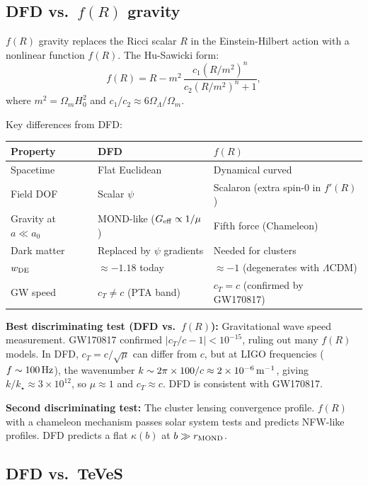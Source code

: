 \documentclass[11pt]{article}
\newcommand{\ee}[1]{\times 10^{#1}}
\newcommand{\mufd}{\mu}
\begin{document}
\subsection{DFD vs.\ $f(R)$ gravity}

$f(R)$ gravity replaces the Ricci scalar $R$ in the Einstein-Hilbert
action with a nonlinear function $f(R)$.  The Hu-Sawicki form:
\begin{equation}
  f(R) = R - m^2\,\frac{c_1(R/m^2)^n}{c_2(R/m^2)^n + 1},
\end{equation}
where $m^2 = \Omega_m H_0^2$ and $c_1/c_2 \approx 6\Omega_\Lambda/\Omega_m$.

Key differences from DFD:
\begin{center}
\begin{tabular}{lll}
\toprule
Property & DFD & $f(R)$ \\
\midrule
Spacetime & Flat Euclidean & Dynamical curved \\
Field DOF & Scalar $\psi$ & Scalaron (extra spin-0 in $f'(R)$) \\
Gravity at $a \ll a_0$ & MOND-like ($G_{\rm eff} \propto 1/\mufd$) & Fifth force (Chameleon) \\
Dark matter & Replaced by $\psi$ gradients & Needed for clusters \\
$w_{\rm DE}$ & $\approx -1.18$ today & $\approx -1$ (degenerates with $\Lambda$CDM) \\
GW speed & $c_T \neq c$ (PTA band) & $c_T = c$ (confirmed by GW170817) \\
\bottomrule
\end{tabular}
\end{center}

\textbf{Best discriminating test (DFD vs.\ $f(R)$):} Gravitational wave
speed measurement.  GW170817 confirmed $|c_T/c - 1| < 10^{-15}$, ruling
out many $f(R)$ models.  In DFD, $c_T = c/\sqrt{\mufd}$ can differ from
$c$, but at LIGO frequencies ($f \sim 100\,{\rm Hz}$), the wavenumber
$k \sim 2\pi\times 100/c \approx 2\ee{-6}\,{\rm m}^{-1}$, giving
$k/k_\star \approx 3\ee{12}$, so $\mufd \approx 1$ and $c_T \approx c$.
DFD is consistent with GW170817.

\textbf{Second discriminating test:} The cluster lensing convergence profile.
$f(R)$ with a chameleon mechanism passes solar system tests and predicts
NFW-like profiles.  DFD predicts a flat $\kappa(b)$ at $b \gg r_{\rm MOND}$.

\subsection{DFD vs.\ TeVeS}
\end{document}
